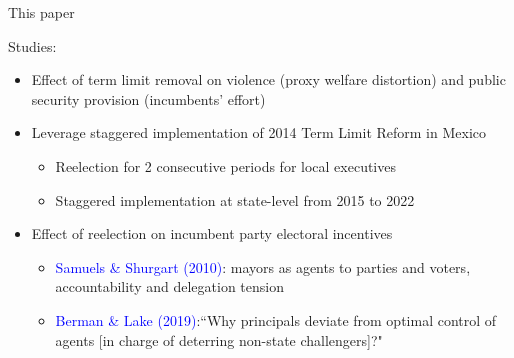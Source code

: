 \documentclass{beamer}
\begin{document}
\begin{frame}[label=this_paper]{This paper}
 
Studies:
\begin{itemize}	
 		  \setlength\itemsep{1em} 
	
	\item Effect of term limit removal on violence (proxy  welfare distortion) and public security provision (incumbents' effort) \hyperlink{why_security}{}

	\item Leverage staggered implementation of 2014 Term Limit Reform in Mexico  \hyperlink{why_mexico}{} 

		\begin{itemize}
		\item Reelection for 2 consecutive periods for local executives
		\item Staggered implementation at state-level from 2015 to 2022
		\end{itemize}
		
	\item Effect of reelection on incumbent party electoral incentives

	    \begin{itemize}
		\item \textcolor{blue}{Samuels \& Shurgart (2010)}: mayors as agents to parties and voters, accountability and delegation tension
		\item \textcolor{blue}{Berman \& Lake (2019)}:``Why principals deviate from optimal control of agents [in charge of deterring non-state challengers]?"
		\end{itemize}

\end{itemize}

	 
\end{frame}
\end{document}
